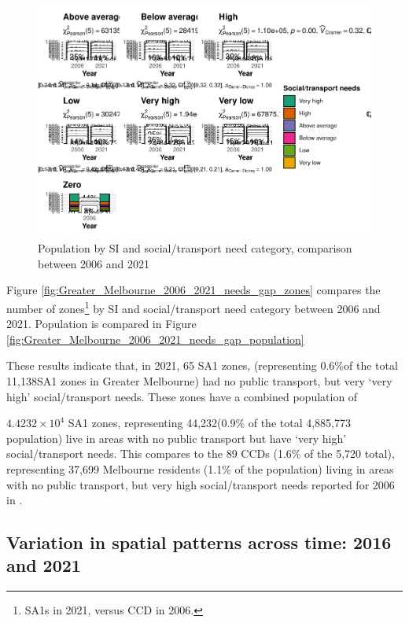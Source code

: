 \documentclass[preprint, 3p,
authoryear]{elsarticle} %
\begin{document}
\begin{figure}
\centering
\includegraphics{Leveraging_GTFS_to_assess_transit_supply_Transport_Geography_files/figure-latex/Greater_Melbourne_2006_2021_needs_gap_population-1.pdf}
\caption{Population by SI and social/transport need category, comparison
between 2006 and 2021}
\end{figure}

Figure \ref{fig:Greater_Melbourne_2006_2021_needs_gap_zones} compares
the number of zones\footnote{SA1s in 2021, versus CCD in 2006.} by SI
and social/transport need category between 2006 and 2021. Population is
compared in Figure
\ref{fig:Greater_Melbourne_2006_2021_needs_gap_population}

These results indicate that, in 2021, 65 SA1 zones, (representing
0.6\%of the total 11,138SA1 zones in Greater Melbourne) had no public
transport, but very `very high' social/transport needs. These zones have
a combined population of

\ensuremath{4.4232\times 10^{4}} SA1 zones, representing 44,232(0.9\% of
the total 4,885,773 population) live in areas with no public transport
but have `very high' social/transport needs. This compares to the 89
CCDs (1.6\% of the 5,720 total), representing 37,699 Melbourne residents
(1.1\% of the population) living in areas with no public transport, but
very high social/transport needs reported for 2006 in
\citet{currie2010identifying}.

\subsection{Variation in spatial patterns across time: 2016 and
2021}\label{variation-in-spatial-patterns-across-time-2016-and-2021}
\end{document}
